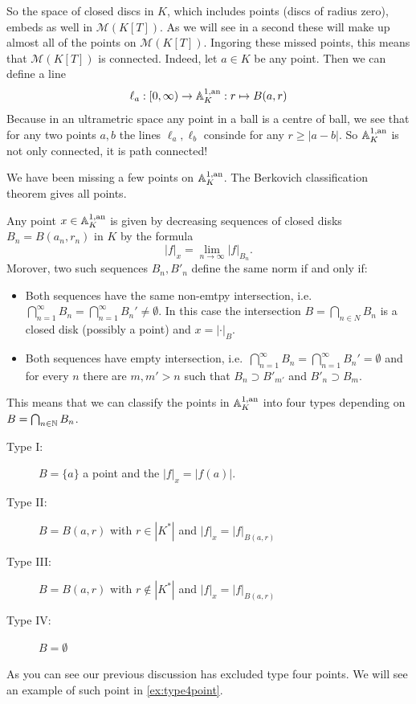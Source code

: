 So the space of closed discs in $K$, which includes points (discs of radius zero), embeds as well in $\mathcal{M} (K[T])$. 
As we will see in a second these will make up almost all of the points on $\mathcal{M} (K[T])$. 
Ingoring these missed points, this means that $\mathcal{M}(K[T])$ is connected. 
Indeed, let $a \in K$ be any point. Then we can define a line \begin{equation}\label{eq:line_in_A_1}
	\ell_a: [0, \infty) \to  \mathbb{A}_K^{1, \text{an}}: r\mapsto B(a, r)
\end{equation}
Because in an ultrametric space any point in a ball is a centre of ball, we see that for any two points $a, b$ the lines $\ell_a, \ell_b$ consinde for any $r \ge |a - b|$. 
So $\mathbb{A}_K^{1,\text{an}}$ is not only connected, it is path connected!

We have been missing a few points on $\mathbb{A}_K^{1, \text{an}}$. 
The Berkovich classification theorem gives all points. 
\begin{theorem}
	Any point $x \in \mathbb{A}_K^{1,\text{an}}$ is given by decreasing sequences of closed disks $B_n = B(a_n, r_n)$ in $K$ by the formula \begin{equation}\label{eq:norm_disk_polynomial}
	|f|_x = \lim_{n \to \infty} |f|_{B_n}
	.\end{equation}
	Morover, two such sequences $B_n, B'_n$ define the same norm if and only if:
	 \begin{itemize}
		\item Both sequences have the same non-emtpy intersection, i.e.\ $\bigcap_{n = 1}^{\infty} B_n = \bigcap_{n = 1}^{\infty} B_n' \ne \emptyset$. 
			In this case the intersection $B = \bigcap_{n \in N} B_n$ is a closed disk (possibly a point) and $x = |\cdot |_B$. 
		\item Both sequences have empty intersection, i.e.\ $\bigcap_{n = 1}^{\infty} B_n = \bigcap_{n = 1}^{\infty} B_n' = \emptyset$  and for every $n$ there are $m, m'> n$ such that $B_n \supset  B'_{m'}$  and $B'_n \supset B_m $.
	\end{itemize}
	This means that we can classify the points in $\mathbb{A} ^{1,\text{an}}_K$ into four types depending on $B = \bigcap_{n \in \mathbb{N}} B_n$. 
	\begin{description}
		\item[Type I:] $B = \{a\} $ a point and the $|f|_x = |f(a)|$. 
		\item[Type II:] $B = B(a, r)$ with $r \in |K^* |$ and $|f|_x = |f|_{B(a, r)}$
		\item[Type III:] $B = B (a, r)$ with $r \not\in |K^*|$ and $|f|_x = |f|_{B(a, r)}$
		\item[Type IV:] $B = \emptyset$
	\end{description}
\end{theorem}
As you can see our previous discussion has excluded type four points. We will see an example of such point in \cref{ex:type4point}. 

